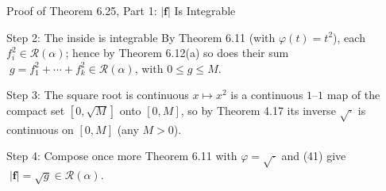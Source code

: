 \documentclass[aspectratio=169,12pt,t]{beamer}
\begin{document}
{%
\begin{frame}{Proof of Theorem 6.25, Part 1: $|\mathbf{f}|$ Is Integrable}
  \begin{proofblock}{Step 2: The inside is integrable}
    By Theorem 6.11 (with $\varphi(t) = t^2$), each $f_i^2 \in \mathscr{R}(\alpha)$;
    hence by Theorem 6.12(a) so does their sum
    $\;g = f_1^2 + \cdots + f_k^2 \in \mathscr{R}(\alpha)$, with $0 \leq g \leq M$.
  \end{proofblock}

  \begin{proofblock}{Step 3: The square root is continuous}
    $x \mapsto x^2$ is a continuous $1$--$1$ map of the compact set
    $[0, \sqrt{M}]$ onto $[0, M]$, so by Theorem 4.17 its inverse
    $\sqrt{\cdot}$ is continuous on $[0, M]$ (any $M > 0$).
  \end{proofblock}

  \begin{proofblock}{Step 4: Compose once more}
    Theorem 6.11 with $\varphi = \sqrt{\cdot}$ and (41) give
    $\;\boxed{|\mathbf{f}| = \sqrt{g} \in \mathscr{R}(\alpha).}$
  \end{proofblock}

\end{frame}

}
\end{document}

